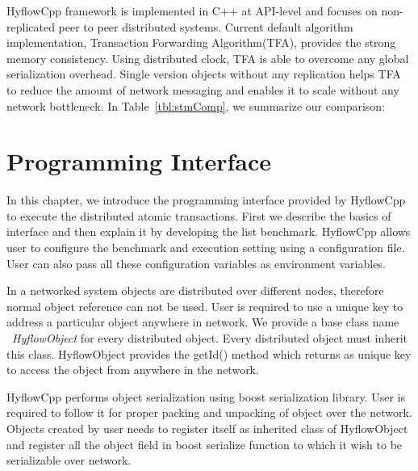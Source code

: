 \documentclass[12pt,english]{report}
\begin{document}
HyflowCpp framework is implemented in C++ at API-level and focuses on non-replicated peer to peer distributed systems. Current default algorithm implementation, Transaction Forwarding Algorithm(TFA), provides the strong memory consistency. Using distributed clock, TFA is able to overcome any global serialization overhead. Single version objects without any replication helps TFA to reduce the amount of network messaging and enables it to scale without any network bottleneck. In Table~\ref{tbl:stmComp}, we summarize our comparison: %

\chapter{Programming Interface}\label{chap:progInterface}

In this chapter, we introduce the programming interface provided by HyflowCpp to execute the distributed atomic transactions. First we describe the basics of interface and then explain it by developing the list benchmark. HyflowCpp allows user to configure the benchmark and execution setting using a configuration file. User can also pass all these configuration variables as environment variables.

In a networked system objects are distributed over different nodes, therefore normal object reference can not be used. User is required to use a unique key to address a particular object anywhere in network. We provide a base class name ~\emph{HyflowObject} for every distributed object. Every distributed object must inherit this class. HyflowObject provides the getId() method which returns as unique key to access the object from anywhere in the network.

HyflowCpp performs object serialization using boost serialization library. User is required to follow it for proper packing and unpacking of object over the network. Objects created by user needs to register itself as inherited class of HyflowObject and register all the object field in boost serialize function to which it wish to be serializable over network.
\end{document}
